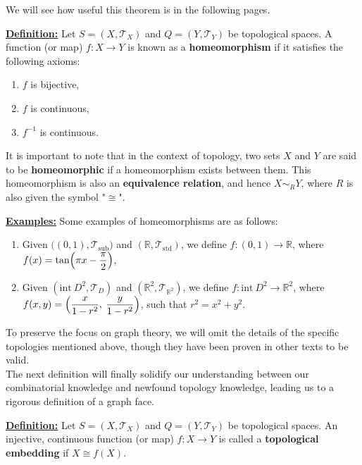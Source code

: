\documentclass{article}
\begin{document}
\noindent We will see how useful this theorem is in the following pages.

\pagebreak

\begin{graybox}
\noindent\underline{\textbf{Definition:}} Let $S = (X, \mathcal{T}_{X})$ and $Q = (Y, \mathcal{T}_{Y})$ be topological spaces. A function (or map) $f:X\to Y$ is known as a \textbf{homeomorphism} if it satisfies the following axioms:
\begin{enumerate}[label=(\roman*)]
    \item $f$ is bijective,
    \item $f$ is continuous,
    \item $f^{-1}$ is continuous.
\end{enumerate}

\noindent It is important to note that in the context of topology, two sets $X$ and $Y$ are said to be \textbf{homeomorphic} if a homeomorphism exists between them. This homeomorphism is also an \textbf{equivalence relation}, and hence $X \sim_{R} Y$, where $R$ is also given the symbol "$\cong$".
\end{graybox}

\noindent\underline{\textbf{Examples:}} Some examples of homeomorphisms are as follows:
\begin{enumerate}[label=(\roman*)]
    \item Given $\bigl((0,1), \mathcal{T}_{\text{sub}}\bigr)$ and $(\mathbb{R}, \mathcal{T}_{\text{std}})$, we define $f:(0,1)\to\mathbb{R}$, where $f(x) = \tan\Bigl(\pi x - \dfrac{\pi}{2}\Bigr)$,
    \item Given $(\text{int}\:D^{2}, \mathcal{T}_{D})$ and $(\mathbb{R}^{2}, \mathcal{T}_{\mathbb{R}^{2}})$, we define $f:\text{int}\:D^{2} \to \mathbb{R}^{2}$, where $f(x,y) = \Bigl(\dfrac{x}{1-r^{2}},\:\dfrac{y}{1-r^{2}}\Bigr)$, such that $r^{2} = x^{2} + y^{2}$.
\end{enumerate}

\noindent To preserve the focus on graph theory, we will omit the details of the specific topologies mentioned above, though they have been proven in other texts to be valid.\\

\noindent The next definition will finally solidify our understanding between our combinatorial knowledge and newfound topology knowledge, leading us to a rigorous definition of a graph face.\\

\begin{graybox}
\noindent\underline{\textbf{Definition:}} Let $S = (X, \mathcal{T}_{X})$ and $Q = (Y, \mathcal{T}_{Y})$ be topological spaces. An injective, continuous function (or map) $f:X\to Y$ is called a \textbf{topological embedding} if $X \cong f(X)$.
\end{graybox}
\end{document}
